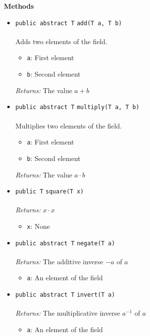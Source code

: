\textbf{\sffamily Methods}
\begin{itemize}
\item \lstinline|public abstract T| \lstinline|add|\lstinline|(T a, T b)|\\ \\[-0.6em]
Adds two elements of the field.
\begin{itemize}
\item \lstinline|a|: First element
\item \lstinline|b|: Second element
\end{itemize}

\emph{Returns:} The value $a + b$

\item \lstinline|public abstract T| \lstinline|multiply|\lstinline|(T a, T b)|\\ \\[-0.6em]
Multiplies two elements of the field.
\begin{itemize}
\item \lstinline|a|: First element
\item \lstinline|b|: Second element
\end{itemize}

\emph{Returns:} The value $a \cdot b$

\item \lstinline|public T| \lstinline|square|\lstinline|(T x)|\\ \\[-0.6em]
\emph{Returns:} $x \cdot x$
\begin{itemize}
\item \lstinline|x|: None
\end{itemize}



\item \lstinline|public abstract T| \lstinline|negate|\lstinline|(T a)|\\ \\[-0.6em]
\emph{Returns:} The additive inverse $-a$ of $a$
\begin{itemize}
\item \lstinline|a|: An element of the field
\end{itemize}



\item \lstinline|public abstract T| \lstinline|invert|\lstinline|(T a)|\\ \\[-0.6em]
\emph{Returns:} The multiplicative inverse $a^{-1}$ of $a$
\begin{itemize}
\item \lstinline|a|: An element of the field
\end{itemize}




\end{itemize}
